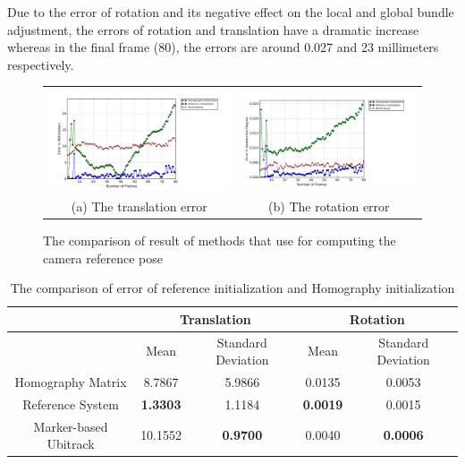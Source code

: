 Due to the error of rotation and its negative effect on the local and global bundle adjustment, the errors of rotation and translation have a dramatic increase whereas in the final frame (80), the errors are around 0.027 and 23 millimeters respectively. 

\begin{figure}[H]
\begin{tabular}{cc}
  \includegraphics[width=80mm]{figures/homo/graph_translation} &  \includegraphics[width=80mm]{figures/homo/graph_rotation} \\
	(a) The translation error & (b) The rotation error \\[6pt]
\end{tabular}
\caption{The comparison of result of methods that use for computing the camera reference pose }\label{fig:initial_pose}
\end{figure}

\begin{table}[H]
\centering
  \begin{tabular}{| c || c | c | c | c |}
      \hline
      & \multicolumn{2}{c|}{Translation} & \multicolumn{2}{c|}{Rotation} \\ \hline
       & Mean & Standard Deviation & Mean & Standard Deviation \\ \hline
      Homography Matrix & 8.7867 & 5.9866 & 0.0135 & 0.0053 \\ \hline
      Reference System & \textbf{1.3303} & 1.1184 & \textbf{0.0019} & 0.0015 \\ \hline
      Marker-based Ubitrack & 10.1552 & \textbf{0.9700} & 0.0040 & \textbf{0.0006} \\ \hline
  \end{tabular}
  \caption{The comparison of error of reference initialization and Homography initialization} \label{tab:initial_pose}
\end{table}

